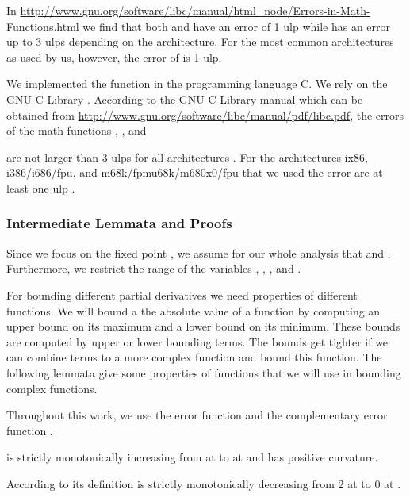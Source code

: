 \documentclass{article}
\begin{document}
In
\url{http://www.gnu.org/software/libc/manual/html_node/Errors-in-Math-Functions.html}
we find that both  and
 have an error of 1 ulp while  has an
error up to 3 ulps depending on the architecture.
For the most common architectures as used by us, however, the error of
 is 1 ulp.



We implemented the function in the programming language C.
We rely on the GNU C Library \citep{Loosemore:16}.
According to the GNU C Library manual which can be obtained from
\url{http://www.gnu.org/software/libc/manual/pdf/libc.pdf},
the errors of the math functions , , and

are not larger than 3 ulps for all architectures
\citep[pp. 528]{Loosemore:16}.
For the architectures ix86, i386/i686/fpu, and m68k/fpmu68k/m680x0/fpu
that we used the error are at least one ulp
\citep[pp. 528]{Loosemore:16}.




\subsubsection{Intermediate Lemmata and Proofs}
\label{sec:smallLemmata}

Since we focus on the fixed point 
,
we assume for our whole analysis
that  and .
Furthermore, we restrict the range of the variables
,
,
, and
.

For bounding different partial derivatives we need properties of
different functions. 
We will bound a the absolute value of a function by computing an upper
bound on its maximum and a lower bound on its minimum. These bounds
are computed by upper or lower bounding terms. The bounds get tighter
if we can combine terms to a more complex function and bound this
function. The following lemmata give some properties of functions that
we will use in bounding complex functions. 

Throughout this work, we use the error function  and the complementary
error function .  
 

\begin{lemma}
\label{lem:basics}

 is strictly monotonically increasing from  at  to
 at  and has positive curvature.

According to its definition  is strictly monotonically decreasing from 2 at  to 0 at .
\end{lemma}
\end{document}
